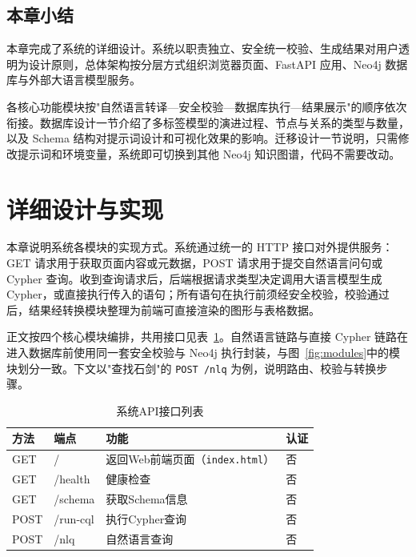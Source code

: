\documentclass[12pt,a4paper]{article}
\begin{document}
\subsection{本章小结}

本章完成了系统的详细设计。系统以职责独立、安全统一校验、生成结果对用户透明为设计原则，总体架构按分层方式组织浏览器页面、FastAPI 应用、Neo4j 数据库与外部大语言模型服务。

各核心功能模块按"自然语言转译—安全校验—数据库执行—结果展示"的顺序依次衔接。数据库设计一节介绍了多标签模型的演进过程、节点与关系的类型与数量，以及 Schema 结构对提示词设计和可视化效果的影响。迁移设计一节说明，只需修改提示词和环境变量，系统即可切换到其他 Neo4j 知识图谱，代码不需要改动。

\newpage

\section{详细设计与实现}
\label{sec:detailed-implementation}

本章说明系统各模块的实现方式。系统通过统一的 HTTP 接口对外提供服务：GET 请求用于获取页面内容或元数据，POST 请求用于提交自然语言问句或 Cypher 查询。收到查询请求后，后端根据请求类型决定调用大语言模型生成 Cypher，或直接执行传入的语句；所有语句在执行前须经安全校验，校验通过后，结果经转换模块整理为前端可直接渲染的图形与表格数据。

正文按四个核心模块编排，共用接口见表~\ref{tab:api}。自然语言链路与直接 Cypher 链路在进入数据库前使用同一套安全校验与 Neo4j 执行封装，与图~\ref{fig:modules}中的模块划分一致。下文以"查找石剑"的 \texttt{POST /nlq} 为例，说明路由、校验与转换步骤。

\begin{table}[H]
    \centering
    \caption{系统API接口列表}
    \label{tab:api}
    \begin{tabular}{llll}
        \toprule
        \textbf{方法} & \textbf{端点} & \textbf{功能} & \textbf{认证} \\
        \midrule
        GET & / & 返回Web前端页面（\texttt{index.html}） & 否 \\
        GET & /health & 健康检查 & 否 \\
        GET & /schema & 获取Schema信息 & 否 \\
        POST & /run-cql & 执行Cypher查询 & 否 \\
        POST & /nlq & 自然语言查询 & 否 \\
        \bottomrule
    \end{tabular}
\end{table}
\end{document}
